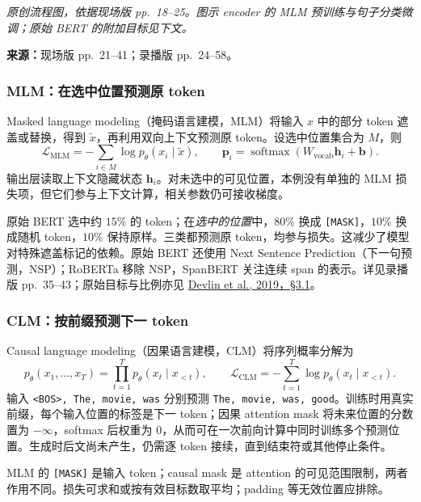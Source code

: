 \begin{center}

\end{center}
{\small\textit{原创流程图，依据现场版 pp.~18--25。图示 encoder 的 MLM 预训练与句子分类微调；原始 BERT 的附加目标见下文。}}

\nopagebreak[4]
\textbf{来源：}现场版 pp.~21--41；录播版 pp.~24--58。

\subsubsection{MLM：在选中位置预测原 token}

Masked language modeling（掩码语言建模，MLM）将输入 $x$ 中的部分 token 遮盖或替换，得到 $\widetilde x$，再利用双向上下文预测原 token。设选中位置集合为 $M$，则
\[
 \mathcal L_{\mathrm{MLM}}
 =-\sum_{i\in M}\log p_\theta(x_i\mid\widetilde x),\qquad
 \mathbf p_i=\operatorname{softmax}(W_{\mathrm{vocab}}\mathbf h_i+\mathbf b).
\]
输出层读取上下文隐藏状态 $\mathbf h_i$。对未选中的可见位置，本例没有单独的 MLM 损失项，但它们参与上下文计算，相关参数仍可接收梯度。

原始 BERT 选中约 $15\%$ 的 token；在\emph{选中的位置}中，$80\%$ 换成 \texttt{[MASK]}，$10\%$ 换成随机 token，$10\%$ 保持原样。三类都预测原 token，均参与损失。这减少了模型对特殊遮盖标记的依赖。原始 BERT 还使用 Next Sentence Prediction（下一句预测，NSP）；RoBERTa 移除 NSP，SpanBERT 关注连续 span 的表示。详见录播版 pp.~35--43；原始目标与比例亦见 \href{https://aclanthology.org/N19-1423.pdf}{Devlin et al., 2019，\S3.1}。

\subsubsection{CLM：按前缀预测下一 token}

Causal language modeling（因果语言建模，CLM）将序列概率分解为
\[
 p_\theta(x_1,\ldots,x_T)=\prod_{t=1}^{T}p_\theta(x_t\mid x_{<t}),\qquad
 \mathcal L_{\mathrm{CLM}}=-\sum_{t=1}^{T}\log p_\theta(x_t\mid x_{<t}).
\]
输入 \texttt{<BOS>, The, movie, was} 分别预测 \texttt{The, movie, was, good}。训练时用真实前缀，每个输入位置的标签是下一 token；因果 attention mask 将未来位置的分数置为 $-\infty$，softmax 后权重为 $0$，从而可在一次前向计算中同时训练多个预测位置。生成时后文尚未产生，仍需逐 token 接续，直到结束符或其他停止条件。

MLM 的 \texttt{[MASK]} 是输入 token；causal mask 是 attention 的可见范围限制，两者作用不同。损失可求和或按有效目标数取平均；padding 等无效位置应排除。

